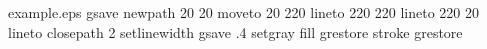 %
%
%
%
%
\begin{filecontents*}{example.eps}
gsave
newpath
  20 20 moveto
  20 220 lineto
  220 220 lineto
  220 20 lineto
closepath
2 setlinewidth
gsave
  .4 setgray fill
grestore
stroke
grestore
\end{filecontents*}
%
\RequirePackage{fix-cm}


%
\documentclass[smallextended]{svjour3}       %
%
\smartqed  %
%
%
%
%
%

\usepackage{graphicx}
\usepackage{enumitem}
%
%
%
%
%
\newcommand{\newG}{\textcolor{magenta}}
\usepackage[english]{babel} 
\usepackage[utf8]{inputenc}

\usepackage{pifont}
\usepackage{mathtools} %
\usepackage{amsfonts}
\usepackage{dsfont}
\usepackage{amsmath}

